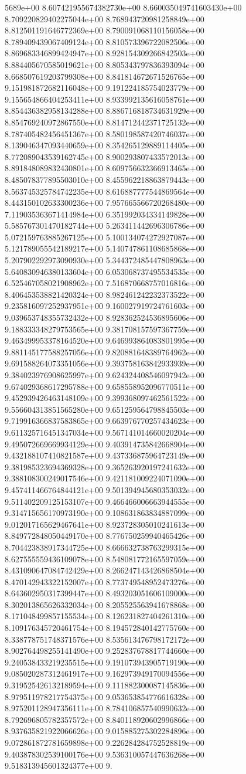 5689e+00	8.607421955674382730e+00	8.660035049741603430e+00	8.709220829402275044e+00	8.768943720981258849e+00	8.812501191646772369e+00	8.790091068110156058e+00	8.789409439067409124e+00	8.810573396722082506e+00	8.869683346899424947e+00	8.928154309266842503e+00	8.884405670585019621e+00	8.805343797836393094e+00	8.668507619203799308e+00	8.841814672671526765e+00	9.151981872682116048e+00	9.191224185754023779e+00	9.155654866404253411e+00	8.933992135616058761e+00	8.854436382958134288e+00	8.886716818734631929e+00	8.854769240972867550e+00	8.814712442371725132e+00	8.787405482456451367e+00	8.580198587420746037e+00	8.139046347093440659e+00	8.354265129889114405e+00	8.772089043539162745e+00	8.900293807433572013e+00	8.891848089832430801e+00	8.609756632366913465e+00	8.485078377895503010e+00	8.455962218863879443e+00	8.563745325784742235e+00	8.616887777544869564e+00	8.443150102633300236e+00	7.957665566720268480e+00	7.119035363671414984e+00	6.351992034334149828e+00	5.585767301470182744e+00	5.263411442696306786e+00	5.072159763885267125e+00	5.100134074272927087e+00	5.121789055542189217e+00	5.140747861108685868e+00	5.207902292973090930e+00	5.344372485447808963e+00	5.640830946380133604e+00	6.053068737495534535e+00	6.525467058021908962e+00	7.516870668757016816e+00	8.406453538821420324e+00	8.982461242232373522e+00	9.235816097252937951e+00	9.160027919724761603e+00	9.039653748355732432e+00	8.928362524536895606e+00	9.188333348279753565e+00	9.381708157597367759e+00	9.463499953378164520e+00	9.646993864083801995e+00	9.881145177588257056e+00	9.820881648389764962e+00	9.691588264073351056e+00	9.393758163842933939e+00	9.384023976908625997e+00	9.624324408546097942e+00	9.674029368617295788e+00	9.658558952096770511e+00	9.452939426463148109e+00	9.399368097462561522e+00	9.556604313851565280e+00	9.651259564798845503e+00	9.719916366837583865e+00	9.663976770257434623e+00	9.611325716451347034e+00	9.567141014660020204e+00	9.495072669669934129e+00	9.403914735842668904e+00	9.432188107410821587e+00	9.437336875964723149e+00	9.381985323694369328e+00	9.365263920197241632e+00	9.388108300249017546e+00	9.421181009224071090e+00	9.457411466764844121e+00	9.501394945680353032e+00	9.511402209125153107e+00	9.466466006663944555e+00	9.314715656170973190e+00	9.108631863834887099e+00	9.012017165629467641e+00	8.923728305010241613e+00	8.849772848050449170e+00	8.776750259940465426e+00	8.704423838917344725e+00	8.666632738763299315e+00	8.627555559436109078e+00	8.548081772165597059e+00	8.431090647084742429e+00	8.266247143426868504e+00	8.470142943322152007e+00	8.773749548952473276e+00	8.643602950317399447e+00	8.493203051606109000e+00	8.302013865626332034e+00	8.205525563941678868e+00	8.171048499857155534e+00	8.126231827404261310e+00	8.109176345720461754e+00	8.194572840142775760e+00	8.338778751748371576e+00	8.535613476798172172e+00	8.902764498255141490e+00	9.252837678817744660e+00	9.240538433219235515e+00	9.191073943905719190e+00	9.085020287312461917e+00	9.162973949170094556e+00	9.319525426132189594e+00	9.111882300087145836e+00	8.979511978217754375e+00	9.053653854776616328e+00	8.975201128947356111e+00	8.784106857540990632e+00	8.792696805782357572e+00	8.840118920602996866e+00	8.937635821922066626e+00	9.015885275302284896e+00	9.072861872781659898e+00	9.226284284752528819e+00	9.403878302539100176e+00	9.536310057447636268e+00	9.518313945601324377e+00	9.